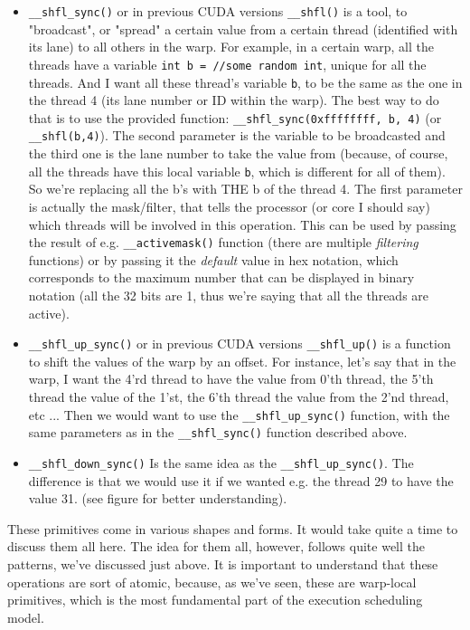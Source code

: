 \documentclass[12pt]{article}
\begin{document}
\begin{itemize}
    \item \verb|__shfl_sync()| or in previous CUDA versions \verb|__shfl()| is a tool, to "broadcast", or "spread"
        a certain value from a certain thread (identified with its lane) to all others in the warp. For example, 
        in a certain warp, all the threads have a variable \verb|int b = //some random int|, unique for all 
        the threads. And I want all these thread's variable \verb|b|, to be the same as the one in the thread 
        4 (its lane number or ID within the warp). The best way to do that is to use the provided function:
        \verb|__shfl_sync(0xffffffff, b, 4)| (or \verb|__shfl(b,4)|). The second parameter is the variable to be 
        broadcasted and the third one is the lane number to take the value from (because, of course, all the 
        threads have this local variable \verb|b|, which is different for all of them). So we're replacing all the 
        b's with THE b of the thread 4. The first parameter is actually the mask/filter, that tells the 
        processor (or core I should say) which threads will be involved in this operation. This can be used 
        by passing the result of e.g. \verb|__activemask()| function (there are multiple \textit{filtering} functions)
        or by passing it the \textit{default} value in hex notation, which corresponds to the maximum number 
        that can be displayed in binary notation (all the 32 bits are 1, thus we're saying that all the threads are active).

    \item \verb|__shfl_up_sync()| or in previous CUDA versions \verb|__shfl_up()| is a function to 
        shift the values of the warp by an offset. For instance, let's say that in the warp, I want 
        the 4'rd thread to have the value from 0'th thread, the 5'th thread the value of the 1'st, the 6'th 
        thread the value from the 2'nd thread, etc ... Then we would want to use the \verb|__shfl_up_sync()| 
        function, with the same parameters as in the \verb|__shfl_sync()| function described above.
    \item \verb|__shfl_down_sync()| Is the same idea as the \verb|__shfl_up_sync()|. The difference is that 
        we would use it if we wanted e.g. the thread 29 to have the value 31. (see figure for better understanding).
\end{itemize}

These primitives come in various shapes and forms. It would take quite a time
to discuss them all here. The idea for them all, however, follows quite well the 
patterns, we've discussed just above. It is important to understand that these operations
are sort of atomic, because, as we've seen, these are warp-local primitives, which is the most 
fundamental part of the execution scheduling model.
\end{document}

